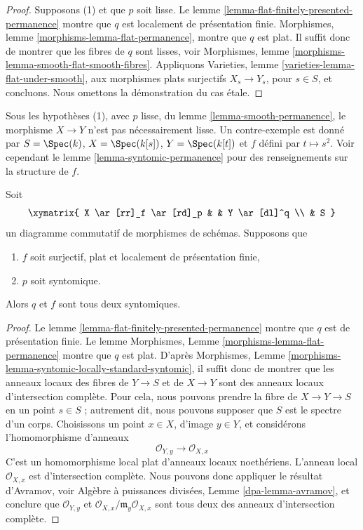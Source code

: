 \begin{proof}
Supposons (1) et que $p$ soit lisse. Le lemme
\ref{lemma-flat-finitely-presented-permanence} montre que $q$ est localement de
présentation finie. Morphismes, lemme
\ref{morphisms-lemma-flat-permanence}, montre que $q$ est plat.
Il suffit donc de montrer que les fibres de $q$ sont lisses, voir Morphismes,
lemme \ref{morphisms-lemma-smooth-flat-smooth-fibres}.
Appliquons Varieties, lemme \ref{varieties-lemma-flat-under-smooth}, aux
morphismes plats surjectifs $X_s \to Y_s$, pour $s \in S$, et concluons.
Nous omettons la démonstration du cas \'etale.
\end{proof}

\begin{remark}
\label{remark-smooth-permanence}
Sous les hypothèses (1), avec $p$ lisse, du lemme
\ref{lemma-smooth-permanence}, le morphisme $X \to Y$ n'est pas nécessairement
lisse. Un contre-exemple est donné par $S = \Spec(k)$,
$X = \Spec(k[s])$, $Y = \Spec(k[t])$ et $f$ défini par
$t \mapsto s^2$. Voir cependant le lemme
\ref{lemma-syntomic-permanence} pour des renseignements sur la structure de
$f$.
\end{remark}

\begin{lemma}
\label{lemma-syntomic-permanence}
Soit
$$
\xymatrix{
X \ar[rr]_f \ar[rd]_p & &
Y \ar[dl]^q \\
& S
}
$$
un diagramme commutatif de morphismes de schémas. Supposons que
\begin{enumerate}
\item $f$ soit surjectif, plat et localement de présentation finie,
\item $p$ soit syntomique.
\end{enumerate}
Alors $q$ et $f$ sont tous deux syntomiques.
\end{lemma}

\begin{proof}
Le lemme \ref{lemma-flat-finitely-presented-permanence} montre que $q$
est de présentation finie. Le lemme
Morphismes, Lemme \ref{morphisms-lemma-flat-permanence}
montre que $q$ est plat.
D'après Morphismes, Lemme
\ref{morphisms-lemma-syntomic-locally-standard-syntomic},
il suffit donc de montrer que les anneaux locaux des fibres de
$Y \to S$ et de $X \to Y$ sont des anneaux locaux d'intersection
complète. Pour cela, nous pouvons prendre la fibre de
$X \to Y \to S$ en un point $s \in S$ ; autrement dit, nous pouvons
supposer que $S$ est le spectre d'un corps. Choisissons un point
$x \in X$, d'image $y \in Y$, et considérons l'homomorphisme d'anneaux
$$
\mathcal{O}_{Y, y} \longrightarrow \mathcal{O}_{X, x}
$$
C'est un homomorphisme local plat d'anneaux locaux noethériens.
L'anneau local $\mathcal{O}_{X, x}$ est d'intersection complète.
Nous pouvons donc appliquer le résultat d'Avramov, voir Algèbre à
puissances divisées, Lemme \ref{dpa-lemma-avramov}, et conclure que
$\mathcal{O}_{Y, y}$ et
$\mathcal{O}_{X, x}/\mathfrak m_y\mathcal{O}_{X, x}$ sont tous deux
des anneaux d'intersection complète.
\end{proof}

